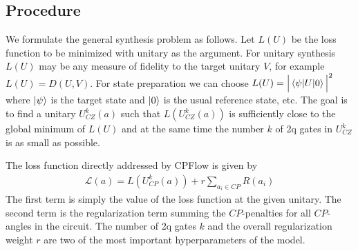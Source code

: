 \documentclass[draft, amsfonts, amssymb, aps, nofootinbib, twocolumn]{revtex4-2}
\begin{document}
\subsection{Procedure}
We formulate the general synthesis problem as follows. Let $L(U)$ be the loss function to be minimized with unitary as the argument. For unitary synthesis $L(U)$ may be any measure of fidelity to the target unitary $V$, for example $L(U)=D(U, V)$. For state preparation we can choose $L(U) = \Big|\braket{\psi|U|0}\Big|^2$ where $\ket{\psi}$ is the target state and $\ket{0}$ is the usual reference state, etc. The goal is to find a unitary $U^k_{CZ}(a)$ such that $L(U^k_{CZ}(a))$ is sufficiently close to the global minimum of $L(U)$ and at the same time the number $k$ of 2q gates in $U^k_{CZ}$ is as small as possible. 

The loss function directly addressed by CPFlow is given by
\begin{align}
\mathcal{L}(a)=L(U^k_{CP}(a))+r\sum_{a_i\in CP} R(a_i) \label{CP loss}
\end{align}
The first term is simply the value of the loss function at the given unitary. The second term is the regularization term summing the $CP$-penalties for all $CP$-angles in the circuit. The number of 2q gates $k$ and the overall regularization weight $r$ are two of the most important hyperparameters of the model.
\end{document}
